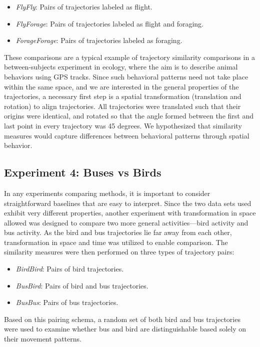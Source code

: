 \documentclass{interact}
\begin{document}
\begin{itemize}
\item \emph{FlyFly}: Pairs of trajectories labeled as flight.
\item \emph{FlyForage}: Pairs of trajectories labeled as flight and foraging.
\item \emph{ForageForage}: Pairs of trajectories labeled as foraging.
\end{itemize}

These comparisons are a typical example of trajectory similarity comparisons in a between-subjects experiment in ecology, where the aim is to describe animal behaviors using GPS tracks. Since such behavioral patterns need not take place within the same space, and we are interested in the general properties of the trajectories, a necessary first step is a spatial transformation (translation and rotation) to align trajectories. All trajectories were translated such that their origins were identical, and rotated so that the angle formed between the first and last point in every trajectory was 45 degrees. We hypothesized that similarity measures would capture differences between behavioral patterns through spatial behavior.


\subsection{Experiment 4: Buses vs Birds}
\label{par:experiment_4}
In any experiments comparing methods, it is important to consider straightforward baselines that are easy to interpret. Since the two data sets used exhibit very different properties, another experiment with transformation in space allowed was designed to compare two more general activities---bird activity and bus activity.
As the bird and bus trajectories lie far away from each other, transformation in space and time was utilized to enable comparison.
The similarity measures were then performed on three types of trajectory pairs:

\begin{itemize}
\item \emph{BirdBird}: Pairs of bird trajectories.
\item \emph{BusBird}: Pairs of bird and bus trajectories.
\item \emph{BusBus}: Pairs of bus trajectories.
\end{itemize}

Based on this pairing schema, a random set of both bird and bus trajectories were used to examine whether bus and bird are distinguishable based solely on their movement patterns.
\end{document}
